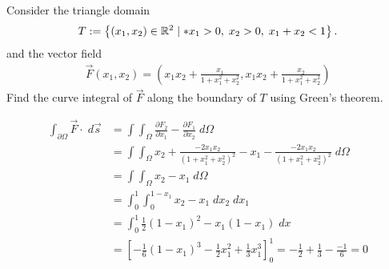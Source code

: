 \documentclass[11pt]{article}
\begin{document}
\begin{exercise}
    Consider the triangle domain 
    \begin{gather*}
        T := \left\{ (x_1,x_2) \in \bbR^{2} \suchthat* x_1 > 0, \; x_2 > 0, \; x_1+x_2 < 1 \right\}.
    \end{gather*}
    and the vector field 
    \begin{gather*}
        \vec F(x_1,x_2) = \left( x_1x_2 + \frac{x_1}{1+x_1^2+x_2^2}, x_1x_2 + \frac{x_2}{1+x_1^2+x_2^2} \right)
    \end{gather*}
    Find the curve integral of $\vec F$ along the boundary of $T$ using Green's theorem.
\end{exercise}
\begin{solution}
\begin{align*}
    \int_{\partial \Omega} \vec{F} \cdot \; d \vec{s}
    &= 
    \int\int_{\Omega} \frac{\partial F_2}{\partial x_1} - \frac{\partial F_1}{\partial x_2}\; d \Omega
    \\
    &= 
    \int\int_{\Omega} x_2 + \frac{-2x_1x_2}{(1+x_1^ 2 + x_2^ 2)^2} - x_1 - \frac{-2x_1x_2}{(1+x_1^ 2 + x_2^ 2)^2} \; d \Omega
    \\
    &= 
    \int\int_{\Omega} x_2  - x_1\; d \Omega
    \\
    &= 
    \int_0^ 1\int_0^ {1-x_1} x_2 - x_1 \;dx_2\;dx_1
    \\
    &= 
    \int_0^ 1 \frac{1}{2}(1-x_1)^ 2 - x_1(1-x_1) \;d x
    \\
    &= 
    \left[ -\frac{1}{6}(1-x_1)^ 3 - \frac{1}{2} x_1^2 + \frac{1}{3}x_1^ 3 \right]_0^1 = -\frac{1}{2} + \frac{1}{3} - \frac{-1}{6} = 0
\end{align*}
\end{solution}
\end{document}
